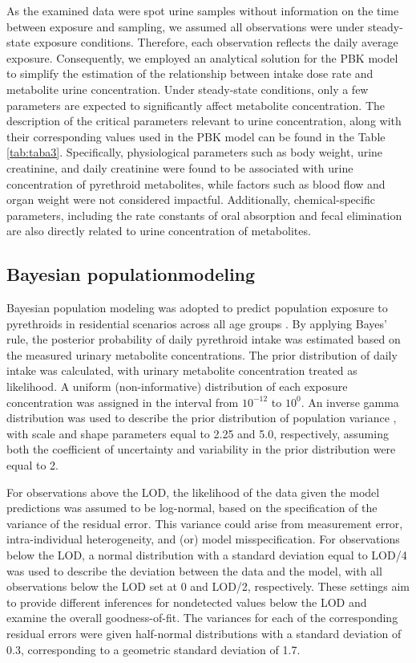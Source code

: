\documentclass[toxics,article,submit,pdftex,moreauthors]{Definitions/mdpi}
\begin{document}
As the examined data were spot urine samples without information on the
time between exposure and sampling, we assumed all observations were
under steady-state exposure conditions. Therefore, each observation
reflects the daily average exposure. Consequently, we employed an
analytical solution for the PBK model to simplify the estimation of the
relationship between intake dose rate and metabolite urine
concentration. Under steady-state conditions, only a few parameters are
expected to significantly affect metabolite concentration. The
description of the critical parameters relevant to urine concentration,
along with their corresponding values used in the PBK model can be found in
the Table \ref{tab:taba3}. Specifically, physiological parameters such
as body weight, urine creatinine, and daily creatinine were found to be
associated with urine concentration of pyrethroid metabolites, while factors such as blood flow
and organ weight were not considered impactful. Additionally,
chemical-specific parameters, including the rate constants of oral
absorption and fecal elimination are also directly related to
urine concentration of metabolites.

\subsection{Bayesian populationmodeling}\label{bayesian-population-modeling}

Bayesian population modeling was adopted to predict population exposure
to pyrethroids in residential scenarios across all age groups
\citep{allen2007use, lyons2008computational}. By applying Bayes' rule,
the posterior probability of daily pyrethroid intake was estimated based
on the measured urinary metabolite concentrations. The prior
distribution of daily intake was calculated, with urinary metabolite
concentration treated as likelihood. A uniform (non-informative)
distribution of each exposure concentration was assigned in the interval
from \(10^{-12}\) to \(10^0\). An inverse gamma distribution was used to
describe the prior distribution of population variance
\citep{lyons2008computational}, with scale and shape parameters equal to
2.25 and 5.0, respectively, assuming both the coefficient of uncertainty
and variability in the prior distribution were equal to 2.

For observations above the LOD, the likelihood of the data given the
model predictions was assumed to be log-normal, based on the
specification of the variance of the residual error. This variance could
arise from measurement error, intra-individual heterogeneity, and (or)
model misspecification. For observations below the LOD, a normal
distribution with a standard deviation equal to LOD/4 was used to
describe the deviation between the data and the model, with all
observations below the LOD set at 0 and LOD/2, respectively. These
settings aim to provide different inferences for nondetected values
below the LOD and examine the overall goodness-of-fit. The variances for
each of the corresponding residual errors were given half-normal
distributions with a standard deviation of 0.3, corresponding to a
geometric standard deviation of 1.7.
\end{document}
